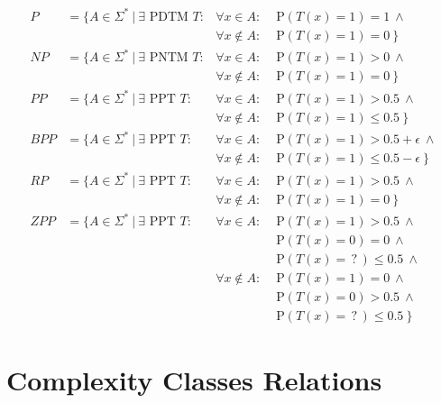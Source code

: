\documentclass[
    13pt,
    oneside,
    a4paper,
    numbers=enddot,
    abstractoff,
    parskip=full
]{scrreprt}
\begin{document}
\begin{align*}
    P & = \{
    A \in \Sigma^\ast ~|~
    \exists \text{ PDTM } T:
    & \forall x \in A:      & \text{ P}(T(x)=1) = 1 ~\land \\
    & & \forall x \notin A: & \text{ P}(T(x)=1) = 0 ~\}
    \\
    NP & = \{
    A \in \Sigma^\ast ~|~
    \exists \text{ PNTM } T:
    & \forall x \in A:      & \text{ P}(T(x)=1) > 0 ~\land \\
    & & \forall x \notin A: & \text{ P}(T(x)=1) = 0 ~\}
    \\
    PP & = \{
    A \in \Sigma^\ast ~|~
    \exists \text{ PPT } T:
    & \forall x \in A:      & \text{ P}(T(x)=1) > 0.5 ~\land \\
    & & \forall x \notin A: & \text{ P}(T(x)=1) \leq 0.5 ~\}
    \\
    BPP & = \{
    A \in \Sigma^\ast ~|~
    \exists \text{ PPT } T:
    & \forall x \in A:      & \text{ P}(T(x)=1) > 0.5 + \epsilon ~\land \\
    & & \forall x \notin A: & \text{ P}(T(x)=1) \leq 0.5 - \epsilon ~\}
    \\
    RP & = \{
    A \in \Sigma^\ast ~|~
    \exists \text{ PPT } T:
    & \forall x \in A:      & \text{ P}(T(x)=1) > 0.5 ~\land \\
    & & \forall x \notin A: & \text{ P}(T(x)=1) = 0 ~\}
    \\
    ZPP & = \{
    A \in \Sigma^\ast ~|~
    \exists \text{ PPT } T:
    & \forall x \in A:      & \text{ P}(T(x)=1) > 0.5 ~\land \\
    & &                     & \text{ P}(T(x)=0) = 0 ~\land \\
    & &                     & \text{ P}(T(x)=\,?\,) \leq 0.5 ~\land \\
    & & \forall x \notin A: & \text{ P}(T(x)=1) = 0 ~\land \\
    & &                     & \text{ P}(T(x)=0) > 0.5 ~\land \\
    & &                     & \text{ P}(T(x)=\,?\,) \leq 0.5 ~\}
\end{align*}








\chapter*{Complexity Classes Relations}
\end{document}
